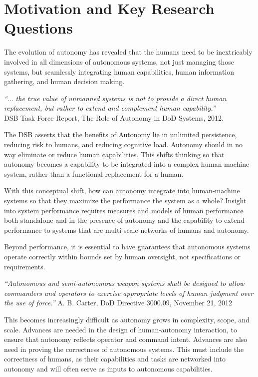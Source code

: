 
\section*{Motivation and Key Research Questions}

The evolution of autonomy has revealed that the humans need to be inextricably involved in all dimensions of autonomous systems, not 
just managing those systems, but seamlessly integrating human capabilities, human information gathering, and human decision making.
\begin{center}
\parbox[c]{6in}{
{\em ``$\ldots$ the true value of unmanned systems is not to provide a direct human replacement, but rather to extend and complement human capability.''} \\
\hspace*{20pt} DSB Task Force Report, The Role of Autonomy in DoD Systems, 2012.
}
\end{center}
The DSB asserts that the benefits of Autonomy lie in unlimited persistence, reducing risk to humans, and reducing cognitive load.
Autonomy should in no way eliminate or reduce human capabilities.  This shifts thinking so that autonomy becomes a capability to
be integrated into a complex human-machine system,  rather than a functional replacement for a human.

With this conceptual shift, how can autonomy integrate into human-machine systems so that they maximize the 
performance the system as a whole?  Insight into system performance requires measures and models of human performance 
both standalone and in the presence of autonomy and the capability to extend performance to systems that are multi-scale
networks of humans and autonomy.

Beyond performance, it is essential to have
guarantees that autonomous systems operate correctly within bounds set by human oversight, not specifications or requirements.
\begin{center}
\parbox[c]{6in}{
{\em ``Autonomous and semi-autonomous weapon systems shall be designed to allow 
commanders and operators to exercise appropriate levels of human judgment over the use of force.''}
\hspace*{20pt} A. B. Carter, DoD Directive 3000.09, November 21, 2012
}
\end{center}
This becomes increasingly difficult as autonomy grows in complexity, scope, and scale.  Advances are needed in 
the design of human-autonomy interaction, to ensure that autonomy reflects operator and command intent.  
Advances are also need in proving the correctness of autonomous systems.  This must include the correctness of
humans, as their capabilities and tasks are networked into autonomy and will often serve as inputs to 
autonomous capabilities.

